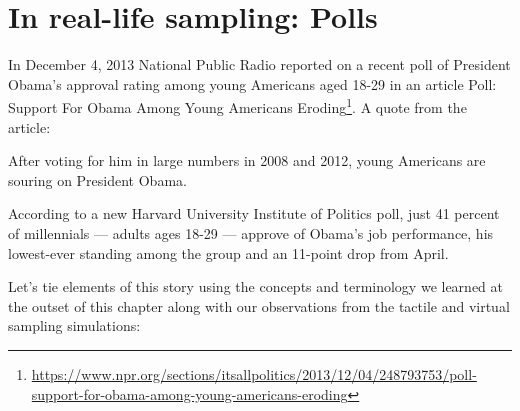 \documentclass[12pt,]{krantz}
\renewenvironment{quote}{\begin{VF}}{\end{VF}}
\renewcommand{\href}[2]{#2\footnote{\url{#1}}}
\theoremstyle{definition}
\theoremstyle{definition}
\theoremstyle{definition}
\theoremstyle{remark}
\begin{document}
\section{In real-life sampling: Polls}\label{polls}

In December 4, 2013 National Public Radio reported on a recent poll of
President Obama's approval rating among young Americans aged 18-29 in an
article
\href{https://www.npr.org/sections/itsallpolitics/2013/12/04/248793753/poll-support-for-obama-among-young-americans-eroding}{Poll:
Support For Obama Among Young Americans Eroding}. A quote from the
article:

\begin{quote}
After voting for him in large numbers in 2008 and 2012, young Americans
are souring on President Obama.

According to a new Harvard University Institute of Politics poll, just
41 percent of millennials --- adults ages 18-29 --- approve of Obama's
job performance, his lowest-ever standing among the group and an
11-point drop from April.
\end{quote}

Let's tie elements of this story using the concepts and terminology we
learned at the outset of this chapter along with our observations from
the tactile and virtual sampling simulations:
\end{document}
